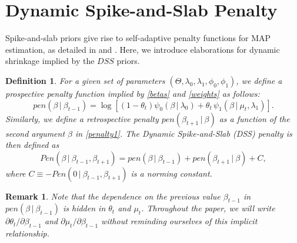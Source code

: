\documentclass[ba]{imsart}
\numberwithin{equation}{section}
\theoremstyle{plain}
\def\C {\,|\:}
\def\C {\,|\:}
\newcommand{\e}{\mathrm{e}}
\newtheorem{remark}{Remark}
\newtheorem{definition}{Definition}
\begin{document}
\section{Dynamic Spike-and-Slab Penalty}\label{sec:pen}
Spike-and-slab priors give rise to self-adaptive penalty functions for MAP estimation, as detailed in \cite{rockova15} and \cite{SSL}. Here, we introduce  elaborations for dynamic shrinkage implied by the $DSS$ priors. 


\begin{definition}
For a given set of parameters $(\Theta,\lambda_0,\lambda_1,\phi_0,\phi_1)$, we define a {\sl prospective} penalty function implied by  \eqref{betas} and \eqref{weights}
as follows:
\begin{equation}\label{penalty1}
pen(\beta\C\beta_{t-1})=\log\left[\left(1-\theta_t\right)\psi_0(\beta\C\lambda_0)+\theta_t\,\psi_1(\beta\C\mu_t,\lambda_1)\right].
\end{equation}
Similarly, we define a {\sl retrospective}  penalty $pen(\beta_{t+1}\C\beta)$  as a function of the second argument $\beta$ in \eqref{penalty1}.
The Dynamic Spike-and-Slab  (DSS)  penalty is then defined as 
\begin{equation}\label{penalty_total}
Pen(\beta\C\beta_{t-1},\beta_{t+1})=pen(\beta\C\beta_{t-1})+pen(\beta_{t+1}\C\beta)+C,
\end{equation}
where $C\equiv-Pen(0\C\beta_{t-1},\beta_{t+1})$ is a norming constant.
\end{definition}
\begin{remark}
Note that the dependence on the previous value $\beta_{t-1}$ in $pen(\beta\C\beta_{t-1})$ is hidden in $\theta_t$ and $\mu_t$. Throughout the paper, we will  write $\partial \theta_t/\partial\beta_{t-1}$ and $\partial\mu_t/\partial\beta_{t-1}$  without reminding ourselves of this implicit relationship.
\end{remark}
\end{document}
